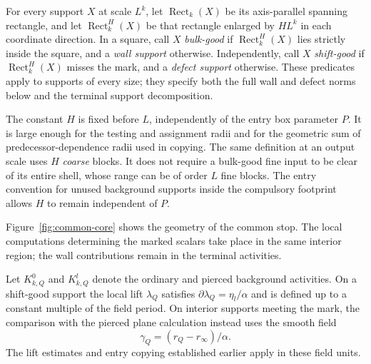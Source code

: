 For every support $X$ at scale $L^k$, let $\operatorname{Rect}_k(X)$ be its
axis-parallel spanning rectangle, and let $\operatorname{Rect}_k^H(X)$ be
that rectangle enlarged by $HL^k$ in each coordinate direction.
In a square, call $X$ \emph{bulk-good} if $\operatorname{Rect}_k^H(X)$ lies
strictly inside the square, and a \emph{wall support} otherwise.
Independently, call $X$ \emph{shift-good} if
$\operatorname{Rect}_k^H(X)$ misses the mark, and a \emph{defect support}
otherwise.  These predicates apply to supports of every size; they
specify both the full wall and defect norms below and the terminal
support decomposition.

The constant $H$ is fixed before $L$, independently of the entry
box parameter $P$.  It is large enough for the testing and assignment
radii and for the geometric sum of predecessor-dependence radii
used in copying.  The same definition at an output scale uses
$H$ \emph{coarse} blocks.  It does not require a bulk-good fine
input to be clear of its entire shell, whose range can be of order
$L$ fine blocks.  The entry convention for unused background supports
inside the compulsory footprint allows $H$ to remain independent
of $P$.

Figure~\ref{fig:common-core} shows the geometry of the common stop.
The local computations determining the marked scalars take place in
the same interior region; the wall contributions remain in the
terminal activities.


Let $K^0_{k,Q}$ and $K^l_{k,Q}$ denote the ordinary and pierced
background activities.  On a shift-good support the local lift
$\lambda_Q$ satisfies
$\partial\lambda_Q=\eta_l/\alpha$ and is defined up to a constant
multiple of the field period.  On interior supports meeting the
mark, the comparison with the pierced plane calculation instead
uses the smooth field
\[
 \gamma_Q=(r_Q-r_\infty)/\alpha.
\]
The lift estimates and entry copying established earlier apply in
these field units.

